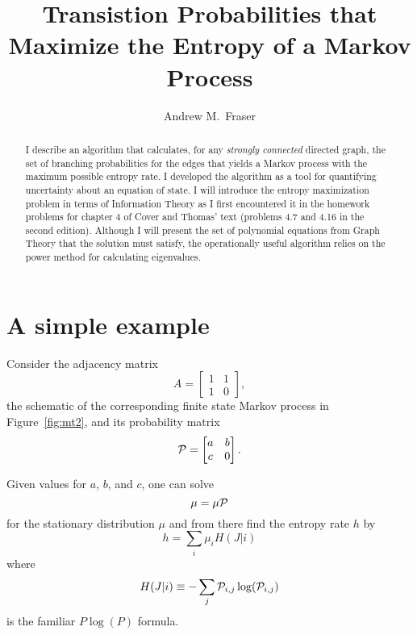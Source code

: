 \documentclass[12pt]{article} \usepackage{amsmath,amsfonts}
\title{Transistion Probabilities that Maximize the Entropy of a Markov
  Process}
\author{Andrew M.\ Fraser}
\newcommand{\T}{{\cal P}}
\begin{document}
\maketitle
\begin{abstract}
  I describe an algorithm that calculates, for any \emph{strongly
    connected} directed graph, the set of branching probabilities for
  the edges that yields a Markov process with the maximum possible
  entropy rate.  I developed the algorithm as a tool for quantifying
  uncertainty about an equation of state.  I will introduce the
  entropy maximization problem in terms of Information Theory as I
  first encountered it in the homework problems for chapter 4 of Cover
  and Thomas' text (problems 4.7 and 4.16 in the second edition).
  Although I will present the set of polynomial equations from Graph
  Theory that the solution must satisfy, the operationally useful
  algorithm relies on the power method for calculating eigenvalues.
\end{abstract}

\section{A simple example}
\label{sec:example}

Consider the adjacency matrix
\begin{equation}
  \label{eq:A}
  A = \begin{bmatrix} 1 & 1 \\ 1 & 0 \end{bmatrix},
\end{equation}
the schematic of the corresponding finite state Markov process in
Figure~\ref{fig:mt2}, and its probability matrix
\begin{equation}
  \label{eq:T}
  \T = \begin{bmatrix} a & b \\ c & 0 \end{bmatrix}.
\end{equation}

\begin{figure*}
  \centering
  \resizebox{0.4\textwidth}{!}{ }
  \caption{A schematic of the finite state Markov process specified by
  Equation~\eqref{eq:T}.}
  \label{fig:mt2}
\end{figure*}

Given values for $a$, $b$, and $c$, one can solve
\begin{equation}
  \label{eq:stationary}
  \mu = \mu \T
\end{equation}
for the stationary distribution $\mu$ and from there find the entropy
rate $h$ by
\begin{equation}
  \label{eq:rate}
  h = \sum_i \mu_i H(J|i)
\end{equation}
where
\begin{equation*}
  H(J|i) \equiv -\sum_j \T_{i,j} \log (\T_{i,j})
\end{equation*}
is the familiar $P\log(P)$ formula.
\end{document}
